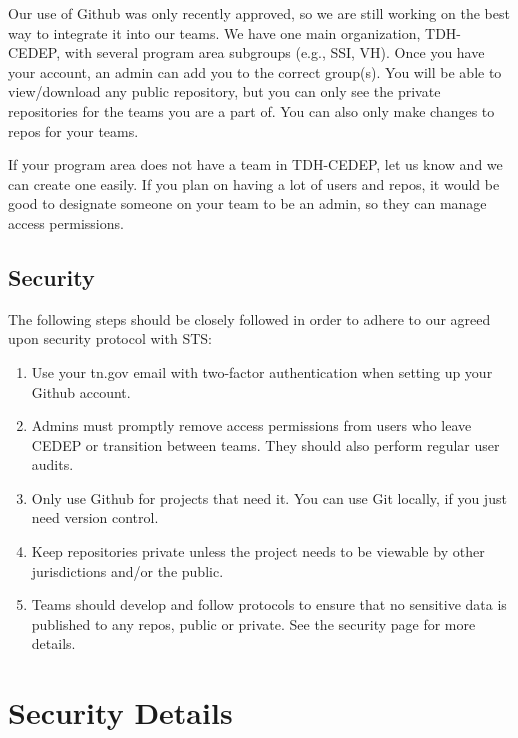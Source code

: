 \documentclass[
  letterpaper,
  DIV=11,
  numbers=noendperiod]{scrreprt}
\begin{document}
Our use of Github was only recently approved, so we are still working on
the best way to integrate it into our teams. We have one main
organization, TDH-CEDEP, with several program area subgroups (e.g., SSI,
VH). Once you have your account, an admin can add you to the correct
group(s). You will be able to view/download any public repository, but
you can only see the private repositories for the teams you are a part
of. You can also only make changes to repos for your teams.

If your program area does not have a team in TDH-CEDEP, let us know and
we can create one easily. If you plan on having a lot of users and
repos, it would be good to designate someone on your team to be an
admin, so they can manage access permissions.

\hypertarget{security}{%
\section*{Security}\label{security}}


The following steps should be closely followed in order to adhere to our
agreed upon security protocol with STS:

\begin{enumerate}
\def\labelenumi{\arabic{enumi}.}
\item
  Use your tn.gov email with two-factor authentication when setting up
  your Github account.
\item
  Admins must promptly remove access permissions from users who leave
  CEDEP or transition between teams. They should also perform regular
  user audits.
\item
  Only use Github for projects that need it. You can use Git locally, if
  you just need version control.
\item
  Keep repositories private unless the project needs to be viewable by
  other jurisdictions and/or the public.
\item
  Teams should develop and follow protocols to ensure that no sensitive
  data is published to any repos, public or private. See the security
  page for more details.
\end{enumerate}


\hypertarget{security-details}{%
\chapter{Security Details}\label{security-details}}
\end{document}

